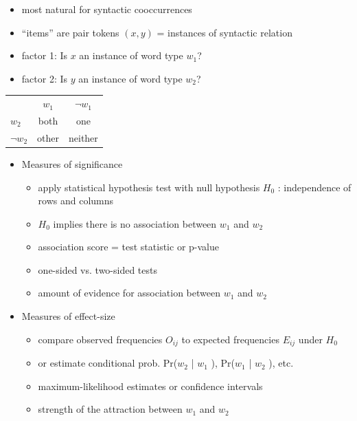 \documentclass[a4paper,landscape,headrule,footrule,dvips]{foils}
\begin{document}
\begin{CJK}{UTF8}{min}
\begin{itemize}
\begin{itemize}
\item most natural for syntactic cooccurrences
\item ``items'' are pair tokens $(x, y)$ = instances of syntactic relation
\item factor 1: Is $x$ an instance of word type $w_1$?
\item factor 2: Is $y$ an instance of word type $w_2$?
\end{itemize}
\end{itemize}



\begin{tabular}{lcc}
     & $w_1$ & $\neg w_1$ \\
   $w_2$ & both & one \\ 
$\neg w_2$ & other & neither 
\end{tabular}


\begin{itemize}
\item Measures of significance
\begin{itemize}
\item
apply statistical hypothesis test with null hypothesis $H_0$ :
independence of rows and columns
\item $H_0$ implies there is no association between $w_1$ and $w_2$
\item association score = test statistic or p-value
\item one-sided vs. two-sided tests
\item[\into] amount of evidence for association between $w_1$ and $w_2$
\end{itemize}
\newpage
\item Measures of effect-size
\begin{itemize}
\item compare observed frequencies $O_{ij}$ to expected
frequencies $E_{ij}$ under $H_0$
\item  or estimate conditional prob. Pr($w_2$ | $w_1$ ), Pr($w_1$ | $w_2$ ), etc.
\item maximum-likelihood estimates or confidence intervals
\item[\into] strength of the attraction between $w_1$ and $w_2$
\end{itemize}
\end{itemize}


\end{CJK}
\end{document}
